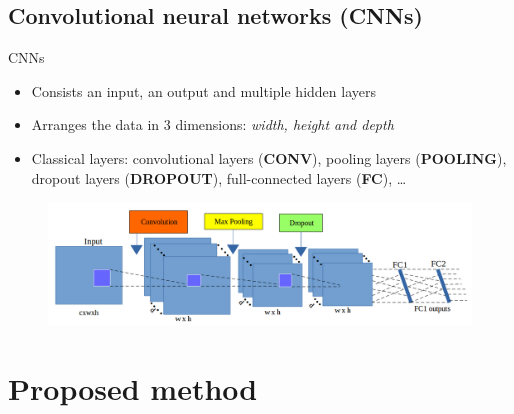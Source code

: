 \documentclass[10pt]{beamer}
\begin{document}
\subsection{Convolutional neural networks (CNNs)}
\begin{frame}{CNNs}
	\begin{itemize}
		\item Consists an input, an output and multiple hidden layers\footnotemark[1]
		\item Arranges the data in $3$ dimensions: \textit{width, height and depth}
		\item Classical layers: convolutional layers (\textbf{CONV}), pooling layers (\textbf{POOLING}), dropout layers (\textbf{DROPOUT}), full-connected layers (\textbf{FC}), \ldots
	\end{itemize}
	\begin{figure}[htbp]
  		\centering
   	 	\includegraphics[scale=.27]{images/arch_cnn}
	\end{figure}
\end{frame}
\section{Proposed method}
\end{document}
